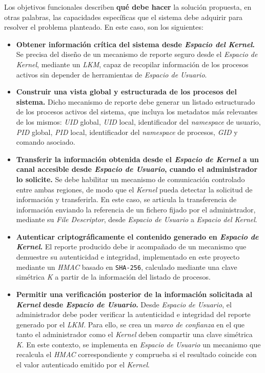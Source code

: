 Los objetivos funcionales describen \textbf{qué debe hacer} la solución propuesta, en otras palabras, las capacidades específicas que el sistema debe adquirir para resolver el problema planteado.
En este caso, son los siguientes:

\begin{itemize}
    \item \textbf{Obtener información crítica del sistema desde \textit{Espacio del Kernel}.} Se precisa del diseño de un mecanismo de reporte seguro desde el \textit{Espacio de Kernel}, mediante un \textit{LKM}, capaz de recopilar información de los procesos activos sin depender de herramientas de \textit{Espacio de Usuario}.
    \item \textbf{Construir una vista global y estructurada de los procesos del sistema.} Dicho mecanismo de reporte debe generar un listado estructurado de los procesos activos del sistema, que incluya los metadatos más relevantes de los mismos: \textit{UID} global, \textit{UID} local, identificador del \textit{namespace} de usuario, \textit{PID} global, \textit{PID} local, identificador del \textit{namespace} de procesos, \textit{GID} y comando asociado.
    \item \textbf{Transferir la información obtenida desde el \textit{Espacio de Kernel} a un canal accesible desde \textit{Espacio de Usuario}, cuando el administrador lo solicite.} Se debe habilitar un mecanismo de comunicación controlado entre ambas regiones, de modo que el \textit{Kernel} pueda detectar la solicitud de información y transferirla. En este caso, se articula la transferencia de información enviando la referencia de un fichero fijado por el administrador, mediante su \textit{File Descriptor}, desde \textit{Espacio de Usuario} a \textit{Espacio del Kernel}.
    \item \textbf{Autenticar criptográficamente el contenido generado en \textit{Espacio de Kernel}.} El reporte producido debe ir acompañado de un mecanismo que demuestre su autenticidad e integridad, implementado en este proyecto mediante un \textit{HMAC} basado en \texttt{SHA-256}, calculado mediante una clave simétrica \textit{K} a partir de la información del listado de procesos.
    \item \textbf{Permitir una verificación posterior de la información solicitada al \textit{Kernel} desde \textit{Espacio de Usuario}.} Desde \textit{Espacio de Usuario}, el administrador debe poder verificar la autenticidad e integridad del reporte generado por el \textit{LKM}. Para ello, se crea un \textit{marco de confianza} en el que tanto el administrador como el \textit{Kernel} deben compartir una clave simétrica \textit{K}. En este contexto, se implementa en \textit{Espacio de Usuario} un mecanismo que recalcula el \textit{HMAC} correspondiente y comprueba si el resultado coincide con el valor autenticado emitido por el \textit{Kernel}.

\end{itemize}
